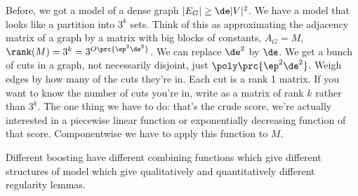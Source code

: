 Before, we got a model of a dense graph $|E_G|\ge \de|V|^2$. We have a model that looks like a partition into $3^k$ sets. Think of this as approximating the adjacency matrix of a graph by a matrix with big blocks of constants, $A_G=M$, $\rank (M) = 3^k = 3^{O\prc{\ep^2\de^2}}$. We can replace $\de^2$ by $\de$. 
We get a bunch of cuts in a graph, not necessarily disjoint, just $\poly\prc{\ep^2\de^2}$. 
Weigh edges by how many of the cuts they're in. Each cut is a rank 1 matrix. If you want to know the number of cuts you're in, write as a matrix of rank $k$ rather than $3^k$. The one thing we have to do: that's the crude score, we're actually interested in a piecewise linear function or exponentially decreasing function of that score.
Componentwise we have to apply this function to $M$. 



Different boosting have different combining functions which give different structures of model which give qualitatively and quantitatively different regularity lemmas.



